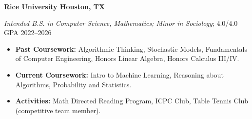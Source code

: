 \textbf{Rice University \hfill Houston, TX} \par
\textit{Intended B.S. in Computer Science, Mathematics; Minor in Sociology}; 4.0/4.0 GPA \hfill 2022--2026\par
\begin{itemize}
    \item \textbf{Past Coursework:} Algorithmic Thinking, Stochastic Models, Fundamentals of Computer Engineering, Honors Linear Algebra, Honors Calculus III/IV.
    \item \textbf{Current Coursework:} Intro to Machine Learning, Reasoning about Algorithms, Probability and Statistics.
    \item \textbf{Activities:}  Math Directed Reading Program, ICPC Club, Table Tennis Club (competitive team member).
\end{itemize}